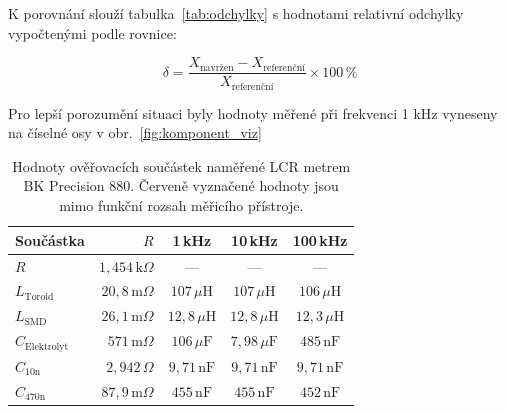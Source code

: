 K porovnání slouží tabulka~\ref{tab:odchylky} s hodnotami relativní odchylky vypočtenými podle rovnice:

\begin{equation}
    \delta = \frac{X_{\mathrm{navržen}} - X_{\mathrm{referenční}}}{X_{\mathrm{referenční}}} \times 100\,\%
    \label{eq:relativni-odchylka}
\end{equation}

Pro lepší porozumění situaci byly hodnoty měřené při frekvenci 1 kHz vyneseny na číselné osy v obr.~\ref{fig:komponent_viz}

\begin{table}[H]
    \centering
    \small
    \caption{Hodnoty ověřovacích součástek naměřené LCR metrem BK Precision 880. 
    Červeně vyznačené hodnoty jsou mimo funkční rozsah měřicího přístroje.}
    \label{tab:vysledky-komponenty}
    \begin{tabular}{@{}l r c c c@{}}
        \toprule
        Součástka           & $R $       & \multicolumn{1}{c}{1\,kHz}   & \multicolumn{1}{c}{10\,kHz}  & \multicolumn{1}{c}{100\,kHz} \\
        \midrule
        $R$                 & $1{,}454\,\mathrm{k}\Omega$ & ---                         & ---                          & ---                          \\
        \addlinespace[0.35em]
        $L_{\mathrm{Toroid}}$   & $20{,}8\,\mathrm{m}\Omega$  & $107\,\mu\mathrm{H}$        & $107\,\mu\mathrm{H}$         & $106\,\mu\mathrm{H}$         \\
        \addlinespace[0.35em]
        $L_{\mathrm{SMD}}$      & $26{,}1\,\mathrm{m}\Omega$  & $12{,}8\,\mu\mathrm{H}$     & $12{,}8\,\mu\mathrm{H}$      & $12{,}3\,\mu\mathrm{H}$      \\
        \addlinespace[0.35em]
        $C_{\mathrm{Elektrolyt}}$ & $571\,\mathrm{m}\Omega$   & $106\,\mu\mathrm{F}$        & \cellcolor{red!20}$7{,}98\,\mu\mathrm{F}$      & \cellcolor{red!20}$485\,\mathrm{nF}$           \\
        \addlinespace[0.35em]
        $C_{\mathrm{10n}}$      & $2{,}942\,\Omega$          & $9{,}71\,\mathrm{nF}$       & $9{,}71\,\mathrm{nF}$        & $9{,}71\,\mathrm{nF}$        \\
        \addlinespace[0.35em]
        $C_{\mathrm{470n}}$     & $87{,}9\,\mathrm{m}\Omega$  & $455\,\mathrm{nF}$          & $455\,\mathrm{nF}$           & $452\,\mathrm{nF}$           \\
        \bottomrule
    \end{tabular}
\end{table}

